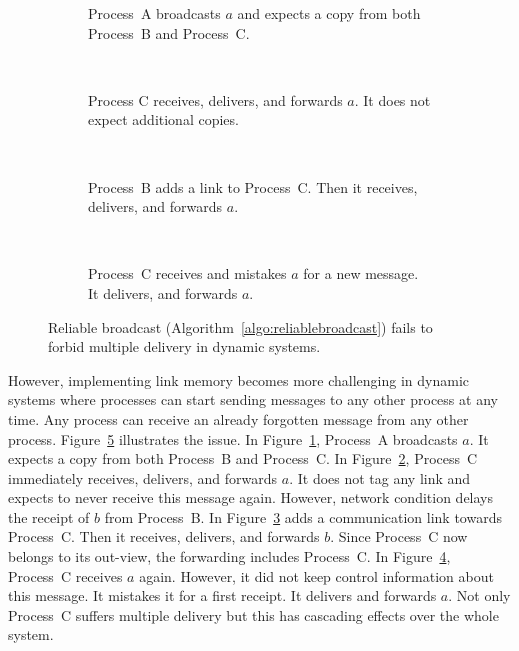 \begin{figure}
  \begin{center}
    \begin{subfigure}[t]{0.23\textwidth}
      \centering%
      \caption{\label{fig:memorylinkfailsA}Process~A broadcasts $a$ and expects a copy
        from both Process~B and Process~C.}
    \end{subfigure}
    ~
    \begin{subfigure}[t]{0.23\textwidth}
      \centering%
      \caption{\label{fig:memorylinkfailsB}Process C receives, delivers, and
        forwards $a$. It does not expect additional copies.}
    \end{subfigure}
    ~
    \begin{subfigure}[t]{0.23\textwidth}
      \centering%
      \caption{\label{fig:memorylinkfailsC}Process~B adds a link to Process~C. 
        Then it receives, delivers, and forwards $a$.}
    \end{subfigure}
    ~
    \begin{subfigure}[t]{0.23\textwidth}
      \centering%
      \caption{\label{fig:memorylinkfailsD}Process~C receives and mistakes $a$
        for a new message. It delivers, and forwards $a$.}
    \end{subfigure}
    \caption{\label{fig:memorylinkfails}Reliable broadcast
      (Algorithm~\ref{algo:reliablebroadcast}) fails to forbid multiple delivery
      in dynamic systems. }
  \end{center}
\end{figure}



However, implementing link memory becomes more challenging in dynamic systems
where processes can start sending messages to any other process at any time. Any
process can receive an already forgotten message from any other
process. Figure~\ref{fig:memorylinkfails} illustrates the issue. In
Figure~\ref{fig:memorylinkfailsA}, Process~A broadcasts $a$. It expects a copy
from both Process~B and Process~C. In Figure~\ref{fig:memorylinkfailsB},
Process~C immediately receives, delivers, and forwards $a$. It does not tag any
link and expects to never receive this message again. However, network condition
delays the receipt of $b$ from Process~B. In Figure~\ref{fig:memorylinkfailsC}
adds a communication link towards Process~C. Then it receives, delivers, and
forwards $b$. Since Process~C now belongs to its out-view, the forwarding
includes Process~C. In Figure~\ref{fig:memorylinkfailsD}, Process~C receives $a$
again. However, it did not keep control information about this message. It
mistakes it for a first receipt. It delivers and forwards $a$. Not only
Process~C suffers multiple delivery but this has cascading effects over the
whole system.

